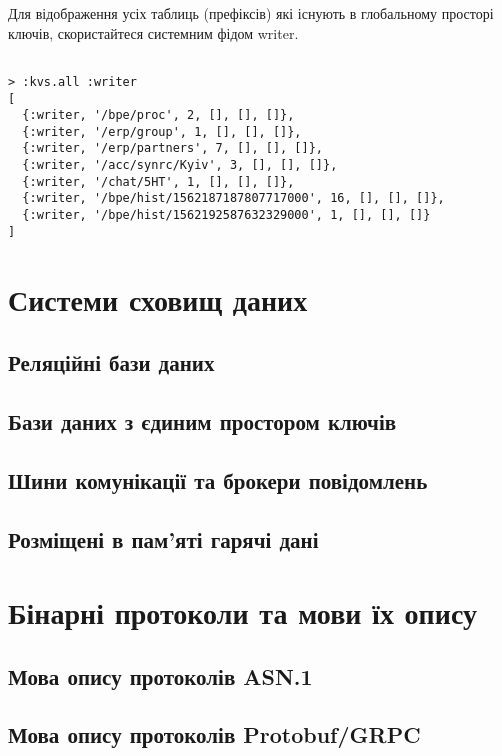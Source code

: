 Для відображення усіх таблиць (префіксів) які існують в глобальному
просторі ключів, скористайтеся системним фідом writer.

\begin{lstlisting}

> :kvs.all :writer
[
  {:writer, '/bpe/proc', 2, [], [], []},
  {:writer, '/erp/group', 1, [], [], []},
  {:writer, '/erp/partners', 7, [], [], []},
  {:writer, '/acc/synrc/Kyiv', 3, [], [], []},
  {:writer, '/chat/5HT', 1, [], [], []},
  {:writer, '/bpe/hist/1562187187807717000', 16, [], [], []},
  {:writer, '/bpe/hist/1562192587632329000', 1, [], [], []}
]
\end{lstlisting}

\section{Системи сховищ даних}

\subsection{Реляційні бази даних}

\subsection{Бази даних з єдиним простором ключів}

\subsection{Шини комунікації та брокери повідомлень}

\subsection{Розміщені в пам'яті гарячі дані}

\section{Бінарні протоколи та мови їх опису}

\subsection{Мова опису протоколів ASN.1}

\subsection{Мова опису протоколів Protobuf/GRPC}

